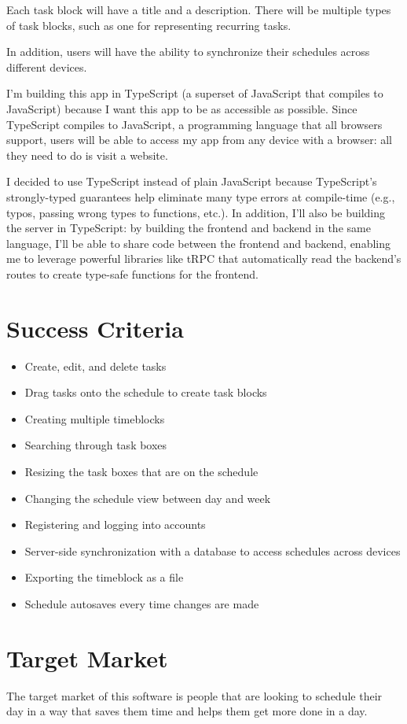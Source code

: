 \documentclass[12pt, notitlepage]{article}
\begin{document}
Each task block will have a title and a description. There will be multiple types of task blocks, such as one for representing recurring tasks.

In addition, users will have the ability to synchronize their schedules across different devices.

I'm building this app in TypeScript (a superset of JavaScript that compiles to JavaScript) because I want this app to be as accessible as possible.
Since TypeScript compiles to JavaScript, a programming language that all browsers support, users will be able to access my app from any device with a browser:
all they need to do is visit a website.

I decided to use TypeScript instead of plain JavaScript because TypeScript's strongly-typed guarantees help eliminate many type errors at compile-time (e.g., typos, passing wrong types to functions, etc.).
In addition, I'll also be building the server in TypeScript:
by building the frontend and backend in the same language, I'll be able to share code between the frontend and backend, enabling me to leverage powerful libraries like tRPC that automatically read the backend's routes to create type-safe functions for the frontend.

\bigskip
{}

\section{Success Criteria}
\begin{itemize}
	\item Create, edit, and delete tasks
	\item Drag tasks onto the schedule to create task blocks
	\item Creating multiple timeblocks
	\item Searching through task boxes
	\item Resizing the task boxes that are on the schedule
	\item Changing the schedule view between day and week
	\item Registering and logging into accounts
	\item Server-side synchronization with a database to access schedules across devices
	\item Exporting the timeblock as a file
	\item Schedule autosaves every time changes are made
\end{itemize}

\section{Target Market}
The target market of this software is people that are looking to schedule their day in a way that saves them time and helps them get more done in a day.
\end{document}
